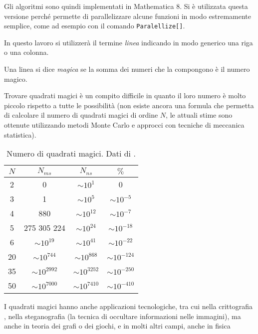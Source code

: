 \documentclass[italian,twoside,twocolumn]{article}
\begin{document}
Gli algoritmi sono quindi implementati in Mathematica 8. Si è utilizzata questa versione perché permette di parallelizzare alcune funzioni in modo estremamente semplice, come ad esempio con il comando \texttt{Paralellize[]}.


In questo lavoro si utilizzerà il termine \emph{linea} indicando in modo generico una riga o una colonna. 

Una linea si dice \emph{magica} se la somma dei numeri che la compongono è il numero magico.

Trovare quadrati magici è un compito difficile in quanto il loro numero è molto piccolo rispetto a tutte le possibilità (non esiste ancora una formula che permetta di calcolare il numero di quadrati magici di ordine $ N $, le attuali stime sono ottenute utilizzando metodi Monte Carlo e approcci con tecniche di meccanica statistica).

\begin{table}
	\caption{Numero di quadrati magici. Dati di \cite{Trump}. }
\begin{tabular}{cccc}
	$ N $ &       $ N_{ms} $        &       $ N_{ns} $        &  $ \si{\percent} $   \\ \hline
	  2   &            0            &    $ \sim  10^{1} $     &          0           \\
	  3   &            1            &     $ \sim 10^{5} $     &   $ \sim 10^{-5} $   \\
	  4   &           880           &    $ \sim 10^{12} $     &   $ \sim 10^{-7} $   \\
	  5   &       275 305 224       &    $ \sim 10^{24} $     &  $ \sim 10^{-18} $   \\
	  6   &    $ \sim 10^{19} $     &    $ \sim 10^{41} $     &  $ \sim 10^{-22} $   \\
	 20   &    $ \sim 10^{744} $    &    $ \sim 10^{868} $    &  $ \sim 10^{-124} $  \\
	 35   &   $ \sim 10^{2992} $    &   $ \sim 10^{3252} $    &  $ \sim 10^{-250} $  \\
	 50   &   $ \sim 10^{7000} $    &   $ \sim 10^{7410} $    &  $ \sim 10^{-410} $\\ \hline
\end{tabular} 
\end{table}
I quadrati magici hanno anche applicazioni tecnologiche, tra cui nella crittografia \cite{TombaShiniraj:2014}, nella steganografia \cite{SahaBha:2015} (la tecnica di occultare informazioni nelle immagini), ma anche in teoria dei grafi o dei giochi, e in molti altri campi, anche in fisica  
\end{document}

